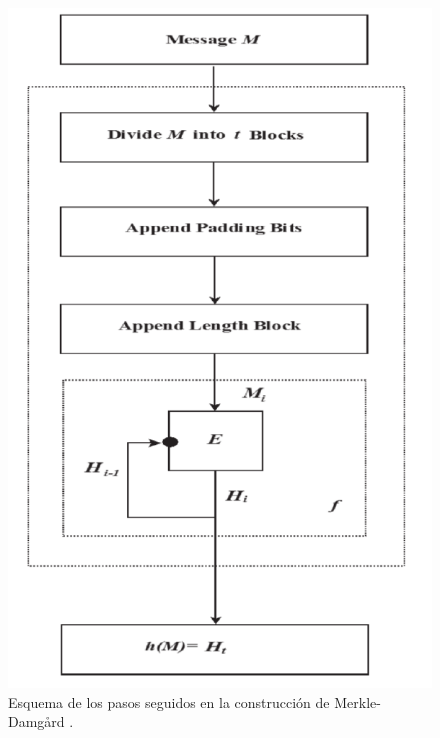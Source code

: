\begin{figure}[htb]
	\centering
	\includegraphics[scale=0.4]{imagenes/md2.png} 
	\caption{Esquema de los pasos seguidos en la construcción de Merkle-Damgård \cite{Tiwari2017}.}
	\label{mdcon}
\end{figure}

